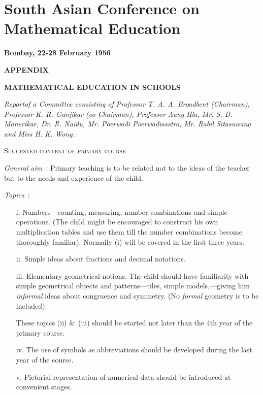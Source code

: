 \chapter{South Asian Conference on Mathematical Education}

\begin{center}
{\bf Bombay, 22-28 February 1956}
\bigskip

{\large\bf APPENDIX}
\medskip

{\bf MATHEMATICAL EDUCATION IN SCHOOLS}
\end{center}

\setcounter{pageoriginal}{172}
{\em Report\pageoriginale of a Committee consisting of Professor T. A. A. Broadbent (Chairman), Professor K. R. Gunjikar (co-Chairman), Professor Aung Hla, Mr. S. D. Manerikar, Dr. R. Naidu, Mr. Poerwadi Poerwadisastro, Mr. Rabil Sitasuwana and Miss H. K. Wong.}

\medskip
\begin{center}
\textsc{Suggested content of primary course}
\end{center}
\medskip

{\em General aim}~: Primary teaching is to be related not to the ideas of the teacher but to the needs and experience of the child.

\medskip

\noindent
{\em Topics}~:
\begin{itemize}
\item[i.] Numbers---counting, measuring; number combinations and simple operations. (The child might be encouraged to construct his own multiplication tables and use them till the number combinations become thoroughly familiar). Normally (i) will be covered in the first three years.

\item[ii.] Simple ideas about fractions and decimal notations.

\item[iii.] Elementary geometrical notions. The child should have familiarity with simple geometrical objects and patterns---tiles, simple models,---giving him {\em informal} ideas about congruence and symmetry. (No {\em formal} geometry is to be included).

These topics (ii) \&\ (iii) should be started not later than the 4th year of the primary course.

\item[iv.] The use of symbols as abbreviations should be developed during the last year of the course.

\item[v.] Pictorial representation of numerical data should be introduced at convenient stages.
\end{itemize}

